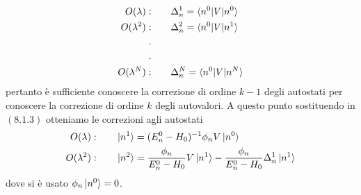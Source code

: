 \documentclass{article}
\begin{document}
\begin{align}
    O(\lambda):& \qquad \Delta_n^1 = \braket{n^0|V|n^0} \notag \\
    O(\lambda^2):& \qquad \Delta_n^2 = \braket{n^0|V|n^1} \notag \\
    . \notag \\
    . \notag \\
    O(\lambda^N):& \qquad \Delta_n^N = \braket{n^0|V|n^N} \notag
\end{align}
pertanto è sufficiente conoscere la correzione di ordine $k - 1$ degli autostati per conoscere la correzione di ordine $k$ degli autovalori. A questo punto sostituendo in $(8.1.3)$ otteniamo le correzioni agli autostati
\begin{align}
    O(\lambda):& \qquad \ket{n^1} = (E_n^0 - H_0)^{-1}\phi_nV\ket{n^0} \notag \\
    O(\lambda^2):& \qquad \ket{n^2} = \frac{\phi_n}{E_n^0 - H_0}V\ket{n^1} - \frac{\phi_n}{E_n^0 - H_0}\Delta_n^1\ket{n^1} \notag
\end{align}
dove si è usato $\phi_n\ket{n^0} = 0$. 
\end{document}
